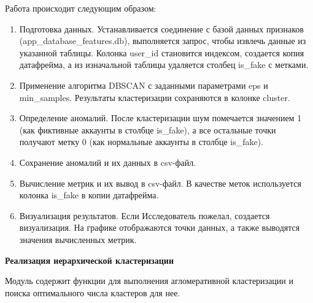 Работа происходит следующим образом:

\begin{enumerate}[itemindent=2cm, leftmargin=0cm, labelsep=0.3cm, topsep=0cm, itemsep=0cm, parsep=0cm, label=\arabic*., after=\vspace{-0.1cm}, before=\vspace{-0.1cm}]
    \item Подготовка данных. Устанавливается соединение с базой данных признаков (app\_database\_features.db), выполняется запрос, чтобы извлечь данные из указанной таблицы. Колонка user\_id становится индексом, создается копия датафрейма, а из изначальной таблицы удаляется столбец is\_fake с метками. 
    \item Применение алгоритма DBSCAN с заданными параметрами eps и min\_samples. Результаты кластеризации сохраняются в колонке cluster.
    \item Определение аномалий. После кластеризации шум помечается значением 1 (как фиктивные аккаунты в столбце is\_fake), а все остальные точки получают метку 0 (как нормальные аккаунты в столбце is\_fake).
    \item Сохранение аномалий и их данных в csv-файл.
    \item Вычисление метрик и их вывод в csv-файл. В качестве меток используется колонка is\_fake в копии датафрейма.
    \item Визуализация результатов. Если Исследователь пожелал, создается визуализация. На графике отображаются точки данных, а также выводятся значения вычисленных метрик.
\end{enumerate}


\textbf{Реализация иерархической кластеризации}

Модуль содержит функции для выполнения агломеративной кластеризации и поиска оптимального числа кластеров для нее.

